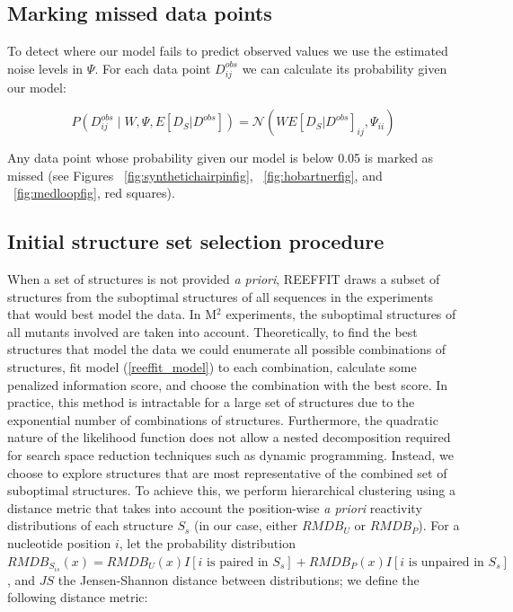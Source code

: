 \documentclass[12pt]{article}
\begin{document}
\subsection{Marking missed data points}
To detect where our model fails to predict observed values we use the estimated noise levels in $\Psi$. 
For each data point $D^{obs}_{ij}$ we can calculate its probability given our model: 

\[P(D^{obs}_{ij} \mid W,\Psi,E[D_S|D^{obs}]) = \mathcal{N}(WE[D_S|D^{obs}]_{ij},\Psi_{ii})\]

Any data point whose probability given our model is below 0.05 is marked as missed (see Figures ~\ref{fig:synthetichairpinfig}, ~\ref{fig:hobartnerfig}, and ~\ref{fig:medloopfig}, red squares).

\subsection{Initial structure set selection procedure}

When a set of structures is not provided \textit{a priori}, REEFFIT draws a subset of structures from the suboptimal structures of all sequences in the experiments that would best model the data. 
In M$^2$ experiments, the suboptimal structures of all mutants involved are taken into account. Theoretically, to find the best structures that model the data we could enumerate all possible combinations of structures, fit model (\ref{reeffit_model}) to each combination, calculate some penalized information score, and choose the combination with the best score. 
In practice, this method is intractable for a large set of structures due to the exponential number of combinations of structures. 
Furthermore, the quadratic nature of the likelihood function does not allow a nested decomposition required for search space reduction techniques such as dynamic programming. 
Instead, we choose to explore structures that are most representative of the combined set of suboptimal structures. 
To achieve this, we perform hierarchical clustering using a distance metric that takes into account the position-wise \textit{a priori} reactivity distributions of each structure $S_s$ (in our case, either $RMDB_U$ or $RMDB_P$). 
For a nucleotide position $i$, let the probability distribution $RMDB_{S_{is}}(x) = RMDB_U(x) I\left[i \mbox{ is paired in } S_s\right] + RMDB_P(x) I\left[i \mbox{ is unpaired in } S_s\right]$, and $JS$ the Jensen-Shannon distance between distributions; we define the following distance metric:
\end{document}
